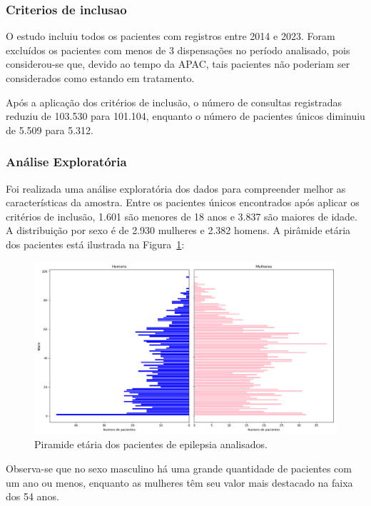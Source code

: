\documentclass[article,a4paper,12pt,brazil,sumario=tradicional]{abntex2}
\begin{document}
\subsubsection{Criterios de inclusao}

O estudo incluiu todos os pacientes com registros entre 2014 e 2023. Foram excluídos os pacientes com menos de 3 dispensações no período analisado, pois considerou-se que, devido ao tempo da APAC, tais pacientes não poderiam ser considerados como estando em tratamento.

Após a aplicação dos critérios de inclusão, o número de consultas registradas reduziu de 103.530 para 101.104, enquanto o número de pacientes únicos diminuiu de 5.509 para 5.312.

\subsubsection{Análise Exploratória}

Foi realizada uma análise exploratória dos dados para compreender melhor as características da amostra. Entre os pacientes únicos encontrados após aplicar os critérios de inclusão, 1.601 são menores de 18 anos e 3.837 são maiores de idade. A distribuição por sexo é de 2.930 mulheres e 2.382 homens. A pirâmide etária dos pacientes está ilustrada na Figura~\ref{fig:piramide_etaria_completa}:

\begin{figure}[ht!]
    \centering
    \includegraphics[width=1\textwidth]{piramide_etaria_completa.png}
    \caption{Piramide etária dos pacientes de epilepsia analisados.}
    \label{fig:piramide_etaria_completa}
\end{figure}

Observa-se que no sexo masculino há uma grande quantidade de pacientes com um ano ou menos, enquanto as mulheres têm seu valor mais destacado na faixa dos 54 anos.
\end{document}
